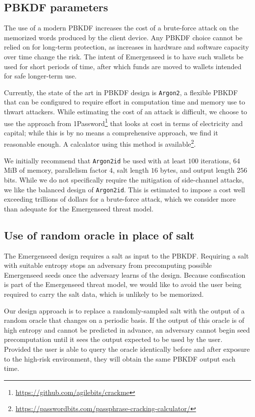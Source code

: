 \documentclass{article}
\begin{document}
\subsection{PBKDF parameters}

The use of a modern PBKDF increases the cost of a brute-force attack on the memorized words produced by the client device.
Any PBKDF choice cannot be relied on for long-term protection, as increases in hardware and software capacity over time change the risk.
The intent of Emergenseed is to have such wallets be used for short periods of time, after which funds are moved to wallets intended for safe longer-term use.

Currently, the state of the art in PBKDF design is \texttt{Argon2}, a flexible PBKDF that can be configured to require effort in computation time and memory use to thwart attackers.
While estimating the cost of an attack is difficult, we choose to use the approach from 1Password\footnote{\url{https://github.com/agilebits/crackme}} that looks at cost in terms of electricity and capital; while this is by no means a comprehensive approach, we find it reasonable enough.
A calcalator using this method is available\footnote{\url{https://passwordbits.com/passphrase-cracking-calculator/}}.

We initially recommend that \texttt{Argon2id} be used with at least $100$ iterations, $64$ MiB of memory, parallelism factor $4$, salt length $16$ bytes, and output length $256$ bits.
While we do not specifically require the mitigation of side-channel attacks, we like the balanced design of \texttt{Argon2id}.
This is estimated to impose a cost well exceeding trillions of dollars for a brute-force attack, which we consider more than adequate for the Emergenseed threat model.


\subsection{Use of random oracle in place of salt}

The Emergenseed design requires a salt as input to the PBKDF.
Requiring a salt with suitable entropy stops an adversary from precomputing possible Emergenseed seeds once the adversary learns of the design.
Because confiscation is part of the Emergenseed threat model, we would like to avoid the user being required to carry the salt data, which is unlikely to be memorized.

Our design approach is to replace a randomly-sampled salt with the output of a random oracle that changes on a periodic basis.
If the output of this oracle is of high entropy and cannot be predicted in advance, an adversary cannot begin seed precomputation until it sees the output expected to be used by the user.
Provided the user is able to query the oracle identically before and after exposure to the high-risk environment, they will obtain the same PBKDF output each time.
\end{document}
